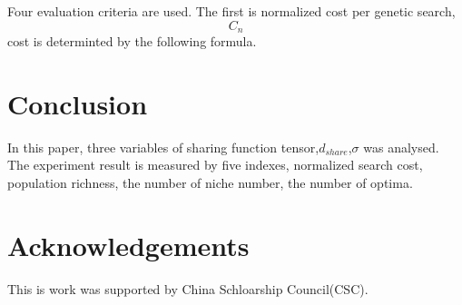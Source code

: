 \documentclass[smallextended]{svjour3}       %
\begin{document}
\begin{multicols}{2}
Four evaluation criteria are used. 
The first is normalized cost per genetic search, $$C_{n}$$
cost is determinted by the following formula.


\section{Conclusion}
In this paper, three variables of sharing function tensor,$d_{share}$,$\sigma$ was analysed.
The experiment result is measured by five indexes, normalized search cost, population richness, 
the number of niche number, the number of optima. 

\section{Acknowledgements}
This is work was supported by China Schloarship Council(CSC).




\end{multicols}
\end{document}
